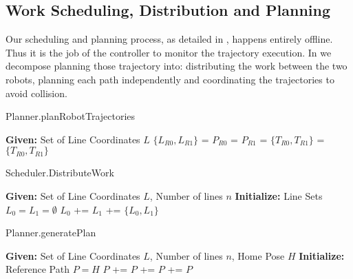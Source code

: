 
\subsection{Work Scheduling, Distribution and Planning}
\label{sec:software_sdp}

Our scheduling and planning process, as detailed in , happens entirely offline. Thus it is the job of the controller to monitor the trajectory execution. In  we decompose planning those trajectory into: distributing the work between the two robots, planning each path independently and coordinating the trajectories to avoid collision. 

\begin{algorithm}[ht!]
\caption{Planner.planRobotTrajectories}
\label{algo:sdp_overview}
\begin{algorithmic}[1]  
\State \textbf{Given:} Set of Line Coordinates $L$ 
\State $\{L_{R0}, L_{R1}\}$ = 
\State $P_{R0}$ = 
\State $P_{R1}$ = 
\State $\{T_{R0}, T_{R1}\}$ = 
\State \Return $\{T_{R0}, T_{R1}\}$
\end{algorithmic}
\end{algorithm}

\begin{algorithm}[ht!]
\caption{Scheduler.DistributeWork}
\label{algo:distribute}
\begin{algorithmic}[1]  
\State \textbf{Given:} Set of Line Coordinates $L$, Number of lines $n$
\State \textbf{Initialize:} Line Sets $L_{0} = L_{1} = \emptyset$
\State $L_{0}$ += 
\State $L_{1}$ += 
\EndProcedure
\State \Return $\{L_{0}, L_{1}\}$
\end{algorithmic}
\end{algorithm}

\begin{algorithm}[ht!]
\caption{Planner.generatePlan}
\label{algo:generatePlan}
\begin{algorithmic}[1]  
\State \textbf{Given:} Set of Line Coordinates $L$, Number of lines $n$, Home Pose $H$
\State \textbf{Initialize:} Reference Path $P = H$
\State $P$ += 
\State $P$ += 
\EndProcedure
\State $P$ += 
\State \Return $P$
\end{algorithmic}
\end{algorithm}


